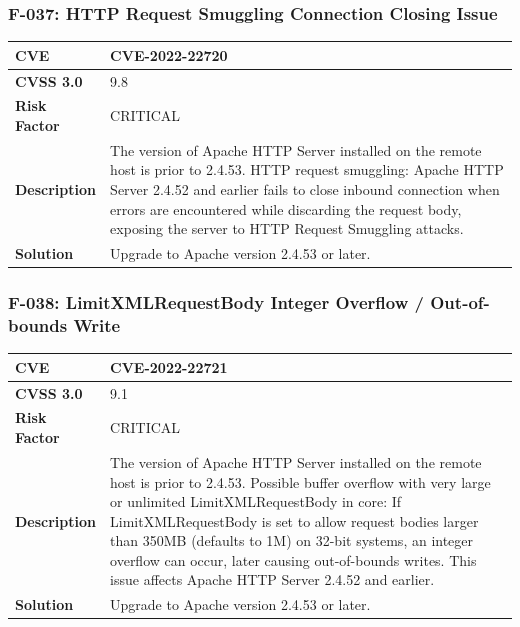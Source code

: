 \subsubsection{F-037: HTTP Request Smuggling Connection Closing Issue}
\begin{tabular}{|p{2.8cm}|p{12.2cm}|}
\hline
\textbf{CVE} & CVE-2022-22720 \\ \hline
\textbf{CVSS 3.0} & 9.8 \\ \hline
\textbf{Risk Factor} & CRITICAL \\ \hline
\textbf{Description} & The version of Apache HTTP Server installed on the remote host is prior to 2.4.53. HTTP request smuggling: Apache HTTP Server 2.4.52 and earlier fails to close inbound connection when errors are encountered while discarding the request body, exposing the server to HTTP Request Smuggling attacks. \\ \hline
\textbf{Solution} & Upgrade to Apache version 2.4.53 or later. \\ \hline
\end{tabular}

\subsubsection{F-038: LimitXMLRequestBody Integer Overflow / Out-of-bounds Write}
\begin{tabular}{|p{2.8cm}|p{12.2cm}|}
\hline
\textbf{CVE} & CVE-2022-22721 \\ \hline
\textbf{CVSS 3.0} & 9.1 \\ \hline
\textbf{Risk Factor} & CRITICAL \\ \hline
\textbf{Description} & The version of Apache HTTP Server installed on the remote host is prior to 2.4.53. Possible buffer overflow with very large or unlimited LimitXMLRequestBody in core: If LimitXMLRequestBody is set to allow request bodies larger than 350MB (defaults to 1M) on 32-bit systems, an integer overflow can occur, later causing out-of-bounds writes. This issue affects Apache HTTP Server 2.4.52 and earlier. \\ \hline
\textbf{Solution} & Upgrade to Apache version 2.4.53 or later. \\ \hline
\end{tabular}

